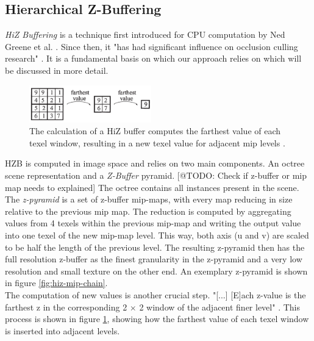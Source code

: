 \subsection{Hierarchical Z-Buffering} \label{subsec-hierarchical-z-buffering}

\emph{\ac{HiZ} Buffering} is a technique first introduced for \ac{CPU} computation by Ned Greene et al. 
\cite{Greene93,Greene95}. Since then, it "has had significant influence on occlusion culling research" 
\cite{AkenineMoeller2018}. It is a fundamental basis on which our approach relies on which will be discussed in more detail.\\

\begin{figure}[h]
    \centering
    \includegraphics[width=200px]{images/graphics/hiz-buf-values.png}
    \caption{The calculation of a \ac{HiZ} buffer computes the farthest value of each texel window, 
    resulting in a new texel value for adjacent mip levels \cite{AkenineMoeller2018}.}
    \label{fig:hiz-value-computation}
\end{figure}

\noindent
\ac{HZB} is computed in image space and relies on two main components. An octree scene representation and a 
\emph{Z-Buffer} pyramid. [@TODO: Check if z-buffer or mip map needs to explained] 
The octree contains all instances present in the scene. The \emph{z-pyramid} is a set of z-buffer mip-maps, with every 
map reducing in size relative to the previous mip map. The reduction is computed by aggregating values from 4 texels 
within the previous mip-map and writing the output value into one texel of the new mip-map level. This way, both axis 
(u and v) are scaled to be half the length of the previous level. The resulting z-pyramid then has the full resolution 
z-buffer as the finest granularity in the z-pyramid and a very low resolution and small texture on the other end. 
An exemplary z-pyramid is shown in figure \ref{fig:hiz-mip-chain}.\\

\noindent
The computation of new values is another crucial step. "[...] [E]ach z-value is the farthest z in the corresponding 
2 \begin{math}\times\end{math} 2 window of the adjacent finer level" \cite{AkenineMoeller2018}. This process is shown 
in figure \ref{fig:hiz-value-computation}, showing how the farthest value of each texel window is inserted into adjacent 
levels.\\

